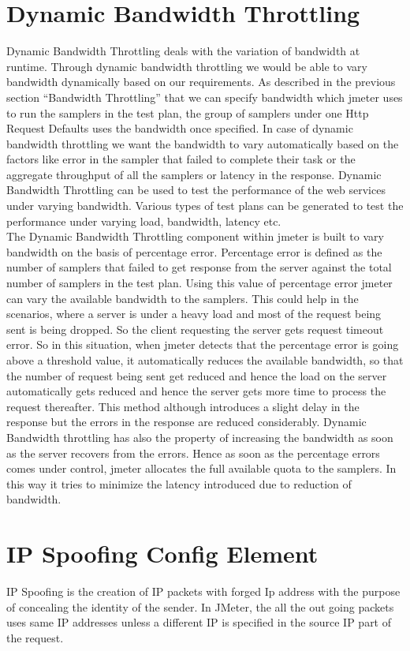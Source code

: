 \documentclass[12pt]{book}
\begin{document}
\section{Dynamic Bandwidth Throttling}
Dynamic Bandwidth Throttling deals with the variation of bandwidth at runtime. Through
dynamic bandwidth throttling we would be able to vary bandwidth dynamically based on our
requirements. As described in the previous section ``Bandwidth Throttling'' that we can specify bandwidth
which jmeter uses to run the samplers in the test plan, the group of samplers under one Http
Request Defaults uses the bandwidth once specified. In case of dynamic bandwidth throttling we
want the bandwidth to vary automatically based on the factors like error in the sampler that failed to
complete their task or the aggregate throughput of all the samplers or latency in the response. Dynamic
Bandwidth Throttling can be used to test the performance of the web services under varying
bandwidth. Various types of test plans can be generated to test the performance under varying
load, bandwidth, latency etc.\\
The Dynamic Bandwidth Throttling component within jmeter is built to vary bandwidth on the
basis of percentage error. Percentage error is defined as the number of samplers that failed to get
response from the server against the total number of samplers in the test plan. Using this value of
percentage error jmeter can vary the available bandwidth to the samplers. This could help in the
scenarios,  where a server is under a heavy load and most of the request being sent is being
dropped. So the client requesting the server gets request timeout error. So in this situation, when
jmeter detects that the percentage error is going above a threshold value, it automatically
reduces the available bandwidth, so that the number of request being sent get reduced and hence
the load on the server automatically gets reduced and hence the server gets more time to process
the request thereafter. This method although introduces a slight delay in the response but the
errors in the response are reduced considerably. Dynamic Bandwidth throttling has also the
property of increasing the bandwidth as soon as the server recovers from the errors. Hence as
soon as the percentage errors comes under control, jmeter allocates the full available quota to the
samplers. In this way it tries to minimize the latency introduced due to reduction of bandwidth.\cite{Comp}

\section{IP Spoofing Config Element}
IP Spoofing is the creation of IP packets with forged Ip address with the purpose of concealing the identity of 
the sender. In JMeter, the all the out  going packets uses same IP addresses unless a different IP is specified
in the source IP part of the request.\\
\end{document}
